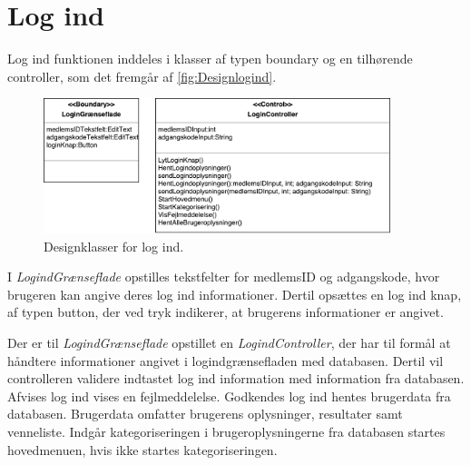 \section{Log ind}

Log ind funktionen inddeles i klasser af typen boundary og en tilhørende controller, som det fremgår af \autoref{fig:Designlogind}. 

\begin{figure} [H]
\centering
\includegraphics[width=0.9\textwidth]{figures/MVC/MVCLogInd}
\caption{Designklasser for log ind.}
\label{fig:Designlogind}
\end{figure}

I \textit{LogindGrænseflade} opstilles tekstfelter for medlemsID og adgangskode, hvor brugeren kan angive deres log ind informationer. Dertil opsættes en log ind knap, af typen button, der ved tryk indikerer, at brugerens informationer er angivet. 

Der er til \textit{LogindGrænseflade} opstillet en \textit{LogindController}, der har til formål at håndtere informationer angivet i logindgrænsefladen med databasen. Dertil vil controlleren validere indtastet log ind information med information fra databasen. Afvises log ind vises en fejlmeddelelse. Godkendes log ind hentes brugerdata fra databasen. Brugerdata omfatter brugerens oplysninger, resultater samt venneliste. Indgår kategoriseringen i brugeroplysningerne fra databasen startes hovedmenuen, hvis ikke startes kategoriseringen. 
